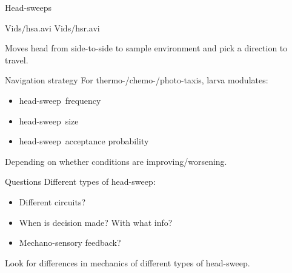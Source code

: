 \documentclass{beamer}%
\newcommand{\citerr}[1]{\hfill {\footnotesize{\color{darkgrey}\cite{#1}}}}
\newcommand{\hs}{head-sweep}
\newcommand{\Hs}{Head-sweep}
\begin{document}
\begin{frame}{\Hs s}
%
 \begin{center}
 {Vids/hsa.avi}
 {Vids/hsr.avi}
 \end{center}
 Moves head from side-to-side to sample environment and pick a direction to travel.
%
\end{frame}


\begin{frame}{Navigation strategy}
%
 For thermo-/chemo-/photo-taxis, larva modulates:
 \begin{itemize}
   \item \hs\ frequency 
   \item \hs\ size  
   \item \hs\ acceptance probability 
 \end{itemize}
 Depending on whether conditions are improving/worsening.

 \citerr{Luo20335462}
%
\end{frame}


\begin{frame}{Questions}
%
 Different types of \hs:
 \begin{itemize}
    \item Different circuits?
    \item When is decision made? With what info?
    \item Mechano-sensory feedback?
  \end{itemize}

  \vp Look for differences in mechanics of different types of \hs.
%
\end{frame}
\end{document}
